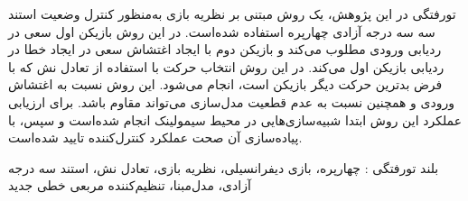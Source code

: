 


\pagestyle{empty}

\begin{وسط‌چین}
\end{وسط‌چین}

‌تورفتگی در این پژوهش، یک روش مبتنی بر نظریه بازی به‌منظور کنترل وضعیت استند سه سه درجه آزادی چهارپره استفاده شده‌است. 
در این روش بازیکن اول سعی در ردیابی ورودی مطلوب می‌کند و بازیکن دوم با ایجاد اغتشاش سعی در ایجاد خطا  در ردیابی بازیکن اول می‌کند.
در این روش انتخاب حرکت با استفاده از تعادل نش که با فرض بدترین حرکت دیگر بازیکن است،  انجام می‌شود.
این روش نسبت به اغتشاش ورودی و همچنین نسبت به عدم قطعیت مدل‌سازی  می‌تواند مقاوم باشد.
برای ارزیابی عملکرد این روش ابتدا شبیه‌سازی‌هایی در محیط سیمولینک انجام شده‌است و سپس، با پیاده‌سازی آن صحت عملکرد کنترل‌کننده تایید شده‌است. 

‌بلند
‌تورفتگی : 
چهارپره،  بازی دیفرانسیلی، نظریه بازی، تعادل نش، استند سه درجه آزادی، مدل‌مبنا، تنظیم‌کننده مربعی خطی 
‌جدید

